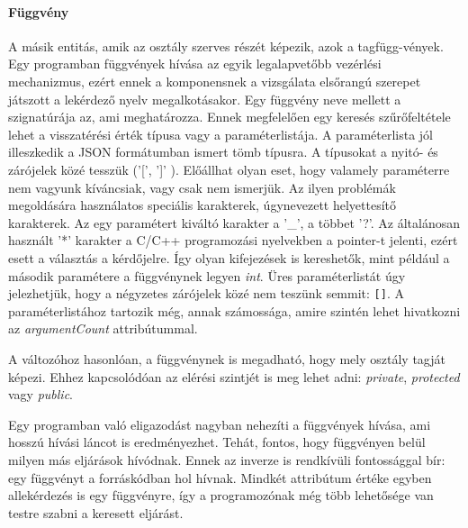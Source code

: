 \documentclass[a4paper,12pt]{report}
\begin{document}
\paragraph{Függvény}
A másik entitás, amik az osztály szerves részét képezik, azok a tagfügg-vények. Egy programban függvények hívása az egyik legalapvetőbb vezérlési mechanizmus, ezért ennek a komponensnek a vizsgálata elsőrangú szerepet játszott a lekérdező nyelv megalkotásakor. Egy függvény neve mellett a szignatúrája az, ami meghatározza. Ennek megfelelően egy keresés szűrőfeltétele lehet a visszatérési érték típusa vagy a paraméterlistája. A paraméterlista jól illeszkedik a JSON formátumban ismert tömb típusra. A típusokat a nyitó- és zárójelek közé tesszük ('[', ']' ). Előállhat olyan eset, hogy valamely paraméterre nem vagyunk kíváncsiak, vagy csak nem ismerjük. Az ilyen problémák megoldására használatos speciális karakterek, úgynevezett helyettesítő karakterek. Az egy paramétert kiváltó karakter a '\_', a többet '?'. Az általánosan használt '*' karakter a C/C++ programozási nyelvekben a pointer-t jelenti, ezért esett a választás a kérdőjelre. Így olyan kifejezések is kereshetők, mint például a második paramétere a függvénynek legyen \textit{int}. Üres paraméterlistát úgy jelezhetjük, hogy a négyzetes zárójelek közé nem teszünk semmit: \texttt{[]}. A paraméterlistához tartozik még, annak számossága, amire szintén lehet hivatkozni az \textit{argumentCount} attribútummal.
\par A változóhoz hasonlóan, a függvénynek is megadható, hogy mely osztály tagját képezi. Ehhez kapcsolódóan az elérési szintjét is meg lehet adni: \textit{private}, \textit{protected} vagy \textit{public}.
\par Egy programban való eligazodást nagyban nehezíti a függvények hívása, ami hosszú hívási láncot is eredményezhet. Tehát, fontos, hogy függvényen belül milyen más eljárások hívódnak. Ennek az inverze is rendkívüli fontossággal bír: egy függvényt a forráskódban hol hívnak. Mindkét attribútum értéke egyben allekérdezés is egy függvényre, így a programozónak még több lehetősége van testre szabni a keresett eljárást.
\end{document}
